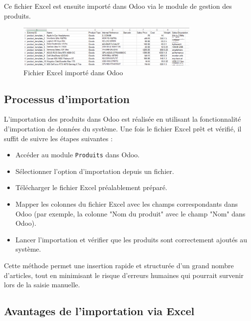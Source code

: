 \documentclass[12pt]{report}
\begin{document}
Ce fichier Excel est ensuite importé dans Odoo via le module de gestion des produits.

\begin{figure}[H]
\centering
\includegraphics[width=0.8\textwidth]{images/ExcelODOO.PNG}
\caption{Fichier Excel importé dans Odoo}
\end{figure}

\subsection{Processus d'importation}

L'importation des produits dans Odoo est réalisée en utilisant la fonctionnalité d'importation de données du système. Une fois le fichier Excel prêt et vérifié, il suffit de suivre les étapes suivantes :
\begin{itemize}
    \item Accéder au module \texttt{Produits} dans Odoo.
    \item Sélectionner l'option d'importation depuis un fichier.
    \item Télécharger le fichier Excel préalablement préparé.
    \item Mapper les colonnes du fichier Excel avec les champs correspondants dans Odoo (par exemple, la colonne "Nom du produit" avec le champ "Nom" dans Odoo).
    \item Lancer l'importation et vérifier que les produits sont correctement ajoutés au système.
\end{itemize}

Cette méthode permet une insertion rapide et structurée d’un grand nombre d’articles, tout en minimisant le risque d'erreurs humaines qui pourrait survenir lors de la saisie manuelle.

\subsection{Avantages de l'importation via Excel}
\end{document}

